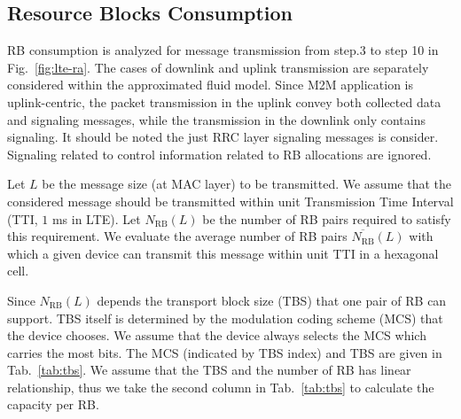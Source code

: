 \subsection{Resource Blocks Consumption}
RB consumption is analyzed for message transmission from step.3 to step 10 in Fig.~\ref{fig:lte-ra}. The cases of downlink and uplink transmission are separately considered within the approximated fluid model. Since M2M application is uplink-centric, the packet transmission in the uplink convey both collected data and signaling messages, while the transmission in the downlink only contains signaling.
It should be noted the just RRC layer signaling messages is consider. Signaling related to control information related to RB allocations are ignored.

Let $L$ be the message size (at MAC layer) to be transmitted. We assume that the considered message should be transmitted within unit Transmission Time Interval (TTI, $1$ ms in LTE). Let $N_{\text{RB}}(L)$ be the number of RB pairs required to satisfy this requirement. We evaluate the average number of RB pairs $\overline{N_{\text{RB}}}(L)$ with which a given device can transmit this message within unit TTI in a hexagonal cell.

Since $N_{\text{RB}}(L)$ depends the transport block size (TBS) that one pair of RB can support. TBS itself is determined by the modulation coding scheme (MCS) that the device chooses. We assume that the device always selects the MCS which carries the most bits. The MCS (indicated by TBS index) and TBS are given in Tab.~\ref{tab:tbs}. We assume that the TBS and the number of RB has linear relationship, thus we take the second column in Tab.~\ref{tab:tbs} to calculate the capacity per RB.

